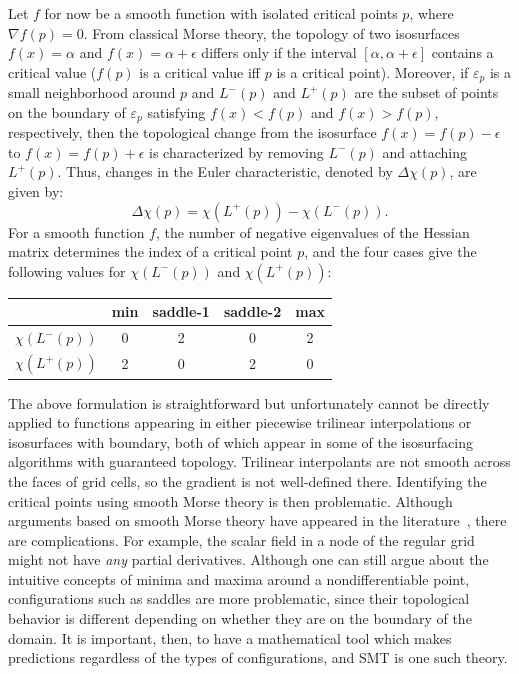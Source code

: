 Let $f$ for now be a smooth function with isolated critical points
$p$, where $\nabla f(p) = 0$.  From classical Morse theory, the
topology of two isosurfaces $f(x)=\alpha$ and $f(x)=\alpha+\epsilon$
differs only if the interval $[\alpha, \alpha + \epsilon]$ contains a
critical value ($f(p)$ is a critical value iff $p$ is a critical
point). Moreover, if $\varepsilon_p$ is a small neighborhood around
$p$ and $L^-(p)$ and $L^+(p)$ are the subset of points on the boundary
of $\varepsilon_p$ satisfying $f(x)<f(p)$ and $f(x)>f(p)$,
respectively, then the topological change from the isosurface
$f(x)=f(p)-\epsilon$ to $f(x)=f(p)+\epsilon$ is characterized by
removing $L^-(p)$ and attaching $L^+(p)$. Thus, changes in the Euler
characteristic, denoted by $\Delta\chi(p)$, are given by:
\begin{equation}
\Delta\chi(p) = \chi(L^+(p)) - \chi(L^-(p)).
\label{eq:deltachi}
\end{equation}
\noindent For a smooth function $f$, the number of negative eigenvalues of the
Hessian matrix determines the index of a critical point $p$, and the
four cases give the following values for $\chi(L^-(p))$
and $\chi(L^+(p))$:
\begin{center}
\begin{tabular}{c|c|c|c|c}
& min & saddle-1 & saddle-2 & max \\
\hline
$\chi(L^-(p))$ & 0 & 2 & 0 & 2 \\ 
$\chi(L^+(p))$ & 2 & 0 & 2 & 0
\end{tabular}
\end{center}
The above formulation is straightforward but unfortunately cannot be directly applied to
functions appearing in either piecewise trilinear interpolations or
isosurfaces with boundary, both of which
appear in some of the isosurfacing algorithms with guaranteed
topology. Trilinear interpolants are not smooth across the faces
of grid cells, so the gradient is not well-defined there. Identifying the
critical points using smooth Morse theory is then
problematic. Although arguments based on smooth Morse
theory have appeared in the
literature~\cite{Weber:2002:ESF}, there are complications. For
example, the scalar field in a node
of the regular grid might not have \emph{any} partial
derivatives. Although one can still argue about the
intuitive concepts of minima and maxima around a nondifferentiable point,
configurations such as saddles are more problematic, since their
topological behavior is different depending on whether they are on the
boundary of the domain. It is 
important, then, to have a mathematical tool which makes predictions
regardless of the types of configurations, and SMT is one such theory.

